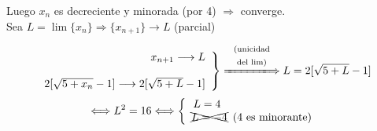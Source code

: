 \documentclass[12pt]{article}
\begin{document}
\begin{ejercicio}[3 puntos]
\begin{enumerate}
            Luego $x_n$ es decreciente y minorada (por 4) $\Longrightarrow$ converge.\\
            Sea $L=\lim\{x_n\} \Longrightarrow \{x_{n+1}\} \longrightarrow L$ (parcial)
            \[
                \left .
                \begin{array}{r}
                     x_{n+1} \longrightarrow L \\\\
                     2[\sqrt{5+x_n}-1] \longrightarrow 2[\sqrt{5+L}-1]
                \end{array}
                \right\} \xLongrightarrow{\begin{array}{c}
                    \text{\scriptsize{(unicidad}} \\
                    \text{\scriptsize{del lim)}} 
                \end{array}} L=2[\sqrt{5+L}-1] 
            \]
            \[
                \Longleftrightarrow L^2 =16 \Longleftrightarrow 
                \left\{
                \begin{array}{l}
                     \, L=4\\
                     \xcancel{L=-4} \,\text{ (4 es minorante)}
                \end{array}
                \right.
            \]
        \end{enumerate}
    \end{ejercicio}
\end{document}
